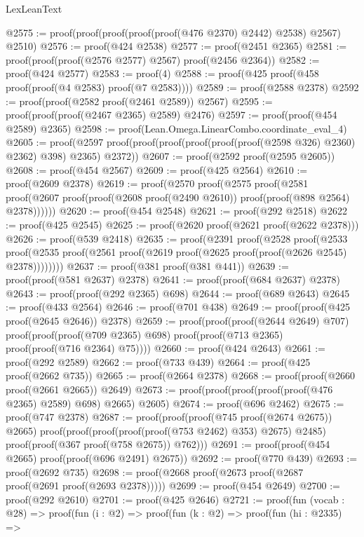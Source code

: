 \begin{lexlean}{LexLeanText}
\begin{coremodule}
@2575 := proof(proof(proof(proof(proof(@476 @2370) @2442) @2538) @2567) @2510)
@2576 := proof(@424 @2538)
@2577 := proof(@2451 @2365)
@2581 := proof(proof(proof(@2576 @2577) @2567) proof(@2456 @2364))
@2582 := proof(@424 @2577)
@2583 := proof(4)
@2588 := proof(@425 proof(@458 proof(proof(@4 @2583) proof(@7 @2583))))
@2589 := proof(@2588 @2378)
@2592 := proof(proof(@2582 proof(@2461 @2589)) @2567)
@2595 := proof(proof(proof(@2467 @2365) @2589) @2476)
@2597 := proof(proof(@454 @2589) @2365)
@2598 := proof(Lean.Omega.LinearCombo.coordinate_eval_4)
@2605 := proof(@2597
      proof(proof(proof(proof(proof(proof(@2598 @326) @2360) @2362) @398) @2365) @2372))
@2607 := proof(@2592 proof(@2595 @2605))
@2608 := proof(@454 @2567)
@2609 := proof(@425 @2564)
@2610 := proof(@2609 @2378)
@2619 := proof(@2570
      proof(@2575
          proof(@2581
              proof(@2607 proof(proof(@2608 proof(@2490 @2610)) proof(proof(@898 @2564) @2378))))))
@2620 := proof(@454 @2548)
@2621 := proof(@292 @2518)
@2622 := proof(@425 @2545)
@2625 := proof(@2620 proof(@2621 proof(@2622 @2378)))
@2626 := proof(@539 @2418)
@2635 := proof(@2391
      proof(@2528
          proof(@2533
              proof(@2535 proof(@2561 proof(@2619 proof(@2625 proof(proof(@2626 @2545) @2378))))))))
@2637 := proof(@381 proof(@381 @441))
@2639 := proof(proof(@581 @2637) @2378)
@2641 := proof(proof(@684 @2637) @2378)
@2643 := proof(proof(@292 @2365) @698)
@2644 := proof(@689 @2643)
@2645 := proof(@433 @2564)
@2646 := proof(@701 @438)
@2649 := proof(proof(@425 proof(@2645 @2646)) @2378)
@2659 := proof(proof(proof(@2644 @2649) @707)
      proof(proof(proof(@709 @2365) @698) proof(proof(@713 @2365) proof(proof(@716 @2364) @75))))
@2660 := proof(@424 @2643)
@2661 := proof(@292 @2589)
@2662 := proof(@733 @439)
@2664 := proof(@425 proof(@2662 @735))
@2665 := proof(@2664 @2378)
@2668 := proof(proof(@2660 proof(@2661 @2665)) @2649)
@2673 := proof(proof(proof(proof(proof(@476 @2365) @2589) @698) @2665) @2605)
@2674 := proof(@696 @2462)
@2675 := proof(@747 @2378)
@2687 := proof(proof(proof(@745 proof(@2674 @2675)) @2665)
      proof(proof(proof(proof(proof(@753 @2462) @353) @2675) @2485)
          proof(proof(@367 proof(@758 @2675)) @762)))
@2691 := proof(proof(@454 @2665) proof(proof(@696 @2491) @2675))
@2692 := proof(@770 @439)
@2693 := proof(@2692 @735)
@2698 := proof(@2668 proof(@2673 proof(@2687 proof(@2691 proof(@2693 @2378)))))
@2699 := proof(@454 @2649)
@2700 := proof(@292 @2610)
@2701 := proof(@425 @2646)
@2721 := proof(fun (vocab : @28) =>
    proof(fun (i : @2) =>
      proof(fun (k : @2) =>
        proof(fun (hi : @2335) =>

\end{coremodule}
\end{lexlean}
